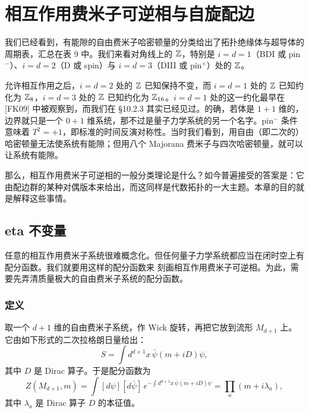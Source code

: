 \chapter{相互作用费米子可逆相与自旋配边}

我们已经看到，有能隙的自由费米子哈密顿量的分类给出了拓扑绝缘体与超导体的周期表，汇总在表 9 中。我们来看对角线上的 $\mathbb{Z}$，特别是 $i=d=1$（BDI 或 pin$^-$）、$i=d=2$（D 或 spin）与 $i=d=3$（DIII 或 pin$^+$）处的 $\mathbb{Z}$。

允许相互作用之后，$i=d=2$ 处的 $\mathbb{Z}$ 已知保持不变，而 $i=d=1$ 处的 $\mathbb{Z}$ 已知约化为 $\mathbb{Z}_8$，$i=d=3$ 处的 $\mathbb{Z}$ 已知约化为 $\mathbb{Z}_{16}$。$i=d=1$ 处的这一约化最早在 [FK09] 中被观察到，而我们在 §10.2.3 其实已经见过。的确，若体是 $1+1$ 维的，边界就只是一个 $0+1$ 维系统，那不过是量子力学系统的另一个名字。pin$^-$ 条件意味着 $T^2=+1$，即标准的时间反演对称性。当时我们看到，用自由（即二次的）哈密顿量无法使系统有能隙；但用八个 Majorana 费米子与四次哈密顿量，就可以让系统有能隙。

那么，相互作用费米子可逆相的一般分类理论是什么？如今普遍接受的答案是：它由配边群的某种对偶版本来给出，而这同样是代数拓扑的一大主题。本章的目的就是解释这些事情。

\section{eta 不变量}

任意的相互作用费米子系统很难概念化。但任何量子力学系统都应当在闭时空上有配分函数。我们就要用这样的配分函数来
刻画相互作用费米子可逆相。为此，需要先弄清质量极大的自由费米子系统的配分函数。

\subsection{定义}

取一个 $d+1$ 维的自由费米子系统，作 Wick 旋转，再把它放到流形 $M_{d+1}$ 上。它由如下形式的二次拉格朗日量给出：
\[
  S=\int d^{d+1}x\,\bar\psi(m+iD)\psi ,
\]
其中 $D$ 是 Dirac 算子。于是配分函数为
\begin{equation}
  Z(M_{d+1},m)=\int[d\psi][d\bar\psi]\,
  e^{-\int d^{d+1}x\,\bar\psi(m+iD)\psi}
  =\prod_a (m+i\lambda_a),
  \tag{12.1}
\end{equation}
其中 $\lambda_a$ 是 Dirac 算子 $D$ 的本征值。

